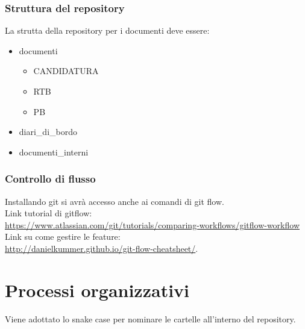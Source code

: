 \documentclass[12pt, oneside]{article}
\begin{document}
\subsubsection{Struttura del repository}
La strutta della repository per i documenti deve essere:
\begin{itemize}
    \item documenti
    \begin{itemize}
        \item CANDIDATURA
        \item RTB
        \item PB
    \end{itemize}
    \item diari\_di\_bordo
    \item documenti\_interni
\end{itemize}
\subsubsection{Controllo di flusso}
Installando git si avrà accesso anche ai comandi di git flow. \\Link tutorial di gitflow: \\ \url{https://www.atlassian.com/git/tutorials/comparing-workflows/gitflow-workflow}\\ Link su come gestire le feature:\\ \url{http://danielkummer.github.io/git-flow-cheatsheet/}.

\newpage
\section{Processi organizzativi}
Viene adottato lo snake case per nominare le cartelle all'interno del repository.
\end{document}
